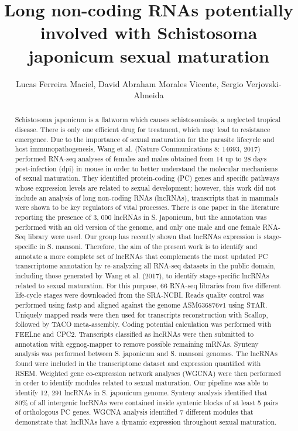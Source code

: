 \documentclass[twoside]{article}
\title{\vspace{-15mm}\fontsize{24pt}{10pt}\selectfont\textbf{ Long non-coding RNAs potentially involved with Schistosoma japonicum sexual maturation }} %
\author{ Lucas Ferreira Maciel, David Abraham Morales Vicente, Sergio Verjovski-Almeida }
\affil{ University of S\~ao Paulo }
\date{}
\begin{document}
  
  
  \maketitle %
  
  
  \thispagestyle{fancy} %
  
  
  \begin{abstract}
  Schistosoma japonicum is a flatworm which causes schistosomiasis,  a neglected tropical disease. There is only one efficient drug for treatment,  which may lead to resistance emergence. Due to the importance of sexual maturation for the parasite lifecycle and host immunopathogenesis,  Wang et al. (Nature Communications 8: 14693,  2017) performed RNA-seq analyses of females and males obtained from 14 up to 28 days post-infection (dpi) in mouse in order to better understand the molecular mechanisms of sexual maturation. They identified protein-coding (PC) genes and specific pathways whose expression levels are related to sexual development; however,  this work did not include an analysis of long non-coding RNAs (lncRNAs),  transcripts that in mammals were shown to be key regulators of vital processes. There is one paper in the literature reporting the presence of 3, 000 lncRNAs in S. japonicum,  but the annotation was performed with an old version of the genome,  and only one male and one female RNA-Seq library were used. Our group has recently shown that lncRNAs expression is stage-specific in S. mansoni. Therefore,  the aim of the present work is to identify and annotate a more complete set of lncRNAs that complements the most updated PC transcriptome annotation by re-analyzing all RNA-seq datasets in the public domain,  including those generated by Wang et al. (2017),  to identify stage-specific lncRNAs related to sexual maturation. For this purpose,  66 RNA-seq libraries from five different life-cycle stages were downloaded from the SRA-NCBI. Reads quality control was performed using fastp and aligned against the genome ASM636876v1 using STAR. Uniquely mapped reads were then used for transcripts reconstruction with Scallop,  followed by TACO meta-assembly. Coding potential calculation was performed with FEELnc and CPC2. Transcripts classified as lncRNAs were then submitted to annotation with eggnog-mapper to remove possible remaining mRNAs. Synteny analysis was performed between S. japonicum and S. mansoni genomes. The lncRNAs found were included in the transcriptome dataset and expression quantified with RSEM. Weighted gene co-expression network analyses (WGCNA) were then performed in order to identify modules related to sexual maturation. Our pipeline was able to identify 12, 291 lncRNAs in S. japonicum genome. Synteny analysis identified that 80\% of all intergenic lncRNAs were contained inside syntenic blocks of at least 5 pairs of orthologous PC genes. WGCNA analysis identified 7 different modules that demonstrate that lncRNAs have a dynamic expression throughout sexual maturation.
  

\end{abstract}
\end{document}
